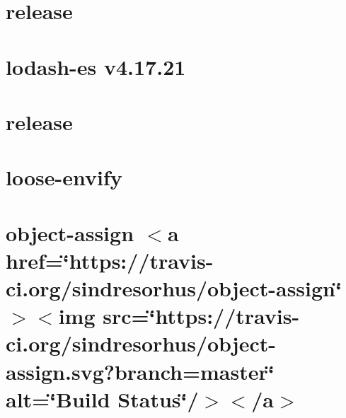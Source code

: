 \let\mypdfximage\pdfximage\def\pdfximage{\immediate\mypdfximage}\documentclass[twoside]{book}
\newcommand{\+}{\discretionary{\mbox{\scriptsize$\hookleftarrow$}}{}{}}
\begin{document}
\chapter{release}
\label{md__c___users_zhart__one_drive__desktop_school_capstone_workspace_capstone_flight_risk_assesment_node_modules_lodash_release}

\chapter{lodash-\/es v4.17.21}
\label{md__c___users_zhart__one_drive__desktop_school_capstone_workspace_capstone_flight_risk_assesment2e21ac97f1d87662c4a6944f5cc5420e}

\chapter{release}
\label{md__c___users_zhart__one_drive__desktop_school_capstone_workspace_capstone_flight_risk_assesment_node_modules_lodash_es_release}

\chapter{loose-\/envify}
\label{md__c___users_zhart__one_drive__desktop_school_capstone_workspace_capstone_flight_risk_assesment63a1a6f7088a91e6deb436f9f7162a80}

\chapter{object-\/assign $<$a href=\char`\"{}https\+://travis-\/ci.\+org/sindresorhus/object-\/assign\char`\"{}$>$$<$img src=\char`\"{}https\+://travis-\/ci.\+org/sindresorhus/object-\/assign.\+svg?branch=master\char`\"{} alt=\char`\"{}\+Build Status\char`\"{}/$>$$<$/a$>$}
\label{md__c___users_zhart__one_drive__desktop_school_capstone_workspace_capstone_flight_risk_assesment6bed86bd2d4c02b96e9e87990d39e685}

\end{document}
